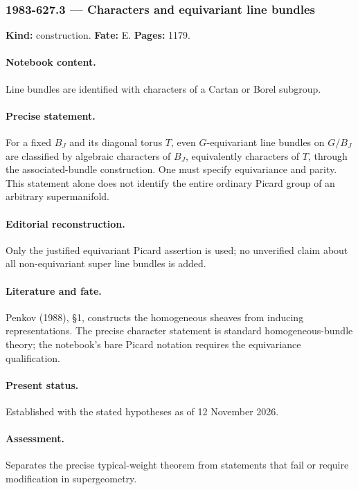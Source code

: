 \subsubsection{1983-627.3 --- Characters and equivariant line bundles}

\label{item:1983-627.3}

\noindent\textbf{Kind:} construction. \textbf{Fate:} E. \textbf{Pages:} 1179.\par

\paragraph{Notebook content.} Line bundles are identified with characters of a Cartan or Borel subgroup.

\paragraph{Precise statement.} For a fixed \(B_J\) and its diagonal torus \(T\), even \(G\)-equivariant line bundles on \(G/B_J\) are classified by algebraic characters of \(B_J\), equivalently characters of \(T\), through the associated-bundle construction. One must specify equivariance and parity. This statement alone does not identify the entire ordinary Picard group of an arbitrary supermanifold.

\paragraph{Editorial reconstruction.} Only the justified equivariant Picard assertion is used; no unverified claim about all non-equivariant super line bundles is added.

\paragraph{Literature and fate.} Penkov (1988), \S1, constructs the homogeneous sheaves from inducing representations. The precise character statement is standard homogeneous-bundle theory; the notebook’s bare Picard notation requires the equivariance qualification.

\paragraph{Present status.} Established with the stated hypotheses as of 12 November 2026.

\paragraph{Assessment.} Separates the precise typical-weight theorem from statements that fail or require modification in supergeometry.

